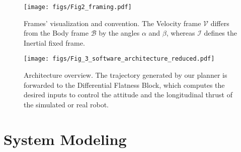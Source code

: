 \begin{figure}[t!]
\texttt{[image: figs/Fig2\_framing.pdf]}
  \caption{Frames' visualization and convention. The Velocity frame $\mathcal{V}$ differs from the Body frame $\mathcal{B}$ by the angles $\alpha$ and $\beta$, whereas $\mathcal{I}$ defines the Inertial fixed frame. 
}
 \label{fig:fig2}
\vspace{-10pt}
\end{figure}

\begin{figure*}[!t]
  \centering
  \texttt{[image: figs/Fig\_3\_software\_architecture\_reduced.pdf]}
  \caption{Architecture overview. The trajectory generated by our planner is forwarded to the Differential Flatness Block, which computes the desired inputs to control the attitude and the longitudinal thrust of the simulated or real robot. %
  \label{fig:software_architecture}}
  \vspace{-20pt}
\end{figure*}


\section{System Modeling}
\label{sec:System_modeling}

